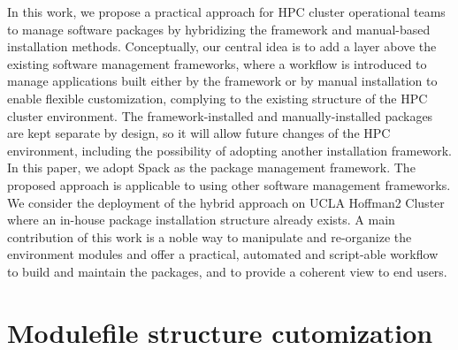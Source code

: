 \documentclass[conference]{IEEEtran}
\begin{document}
In this work, we propose a practical approach for HPC cluster operational teams to manage software packages by hybridizing the framework and manual-based installation methods. 
Conceptually, our central idea is to add a layer above the existing software management frameworks, where a workflow is introduced to manage applications built either by the framework or by manual installation to enable flexible customization, complying to the existing structure of the HPC cluster environment.
The framework-installed and manually-installed packages are kept separate by design, so it will allow future changes of the HPC environment, including the possibility of adopting another installation framework.
In this paper, we adopt Spack as the package management framework. The proposed approach is applicable to using other software management frameworks. We consider the deployment of the hybrid approach on UCLA Hoffman2 Cluster where an in-house package installation structure already exists.
A main contribution of this work is a noble way to manipulate and re-organize the environment modules and offer a practical, automated and script-able workflow to build and maintain the packages, and to provide a coherent view to end users.



\section{Modulefile structure cutomization} \label{subsec_redefine_h2_modulefiles}

\end{document}
